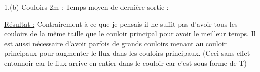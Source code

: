 \documentclass[12pt]{article}
\begin{document}
1.(b) Couloirs 2m :
\newline\newline
Temps moyen de dernière sortie : 
\newline\newline

\underline{Résultat :}
\newline
Contrairement à ce que je pensais il ne suffit pas d'avoir tous les couloirs de la même taille que le couloir principal pour avoir le meilleur temps.
Il est aussi nécessaire d'avoir parfois de grands couloirs menant au couloir principaux pour augmenter le flux dans les couloirs principaux. (Ceci sans effet entonnoir car
le flux arrive en entier dans le couloir car c'est sous forme de T)
\newline
\end{document}
